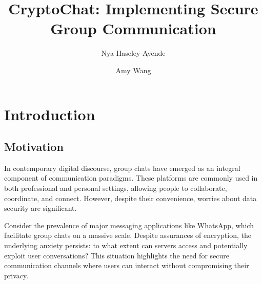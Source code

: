 \documentclass[sigconf]{acmart}
\begin{document}
\title{CryptoChat: Implementing Secure Group Communication}


\author{Nya Haseley-Ayende}

\author{Amy Wang}

\renewcommand{\shortauthors}{Haseley-Ayende, Wang}

\maketitle

\section{Introduction}
\subsection{Motivation}
In contemporary digital discourse, group chats have emerged as an integral component of communication paradigms. These platforms are commonly used in both professional and personal settings, allowing people to collaborate, coordinate, and connect. However, despite their convenience, worries about data security are significant.

Consider the prevalence of major messaging applications like WhatsApp, which facilitate group chats on a massive scale. Despite assurances of encryption, the underlying anxiety persists: to what extent can servers access and potentially exploit user conversations? This situation highlights the need for secure communication channels where users can interact without compromising their privacy.
\end{document}
